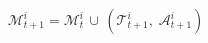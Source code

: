 \documentclass[preview]{standalone}
\begin{document}
\begin{align*}
\mathcal{M}_{t+1}^{i} = \mathcal{M}_{t}^{i} \,\cup\, (\mathcal{T}_{t+1}^{i},\;\mathcal{A}_{t+1}^{i})
\end{align*}
\end{document}
